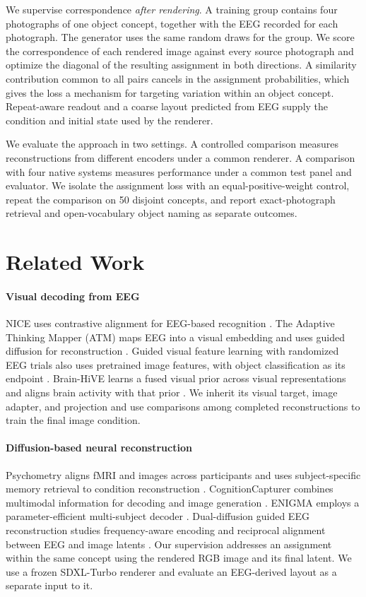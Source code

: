 \documentclass[letterpaper,10pt,conference]{IEEEtran}
\begin{document}
We supervise correspondence \emph{after rendering}. A training group contains four photographs of one object concept, together with the EEG recorded for each photograph. The generator uses the same random draws for the group. We score the correspondence of each rendered image against every source photograph and optimize the diagonal of the resulting assignment in both directions. A similarity contribution common to all pairs cancels in the assignment probabilities, which gives the loss a mechanism for targeting variation within an object concept. Repeat-aware readout and a coarse layout predicted from EEG supply the condition and initial state used by the renderer.

We evaluate the approach in two settings. A controlled comparison measures reconstructions from different encoders under a common renderer. A comparison with four native systems measures performance under a common test panel and evaluator. We isolate the assignment loss with an equal-positive-weight control, repeat the comparison on 50 disjoint concepts, and report exact-photograph retrieval and open-vocabulary object naming as separate outcomes.

\section{Related Work}

\paragraph{Visual decoding from EEG}
NICE uses contrastive alignment for EEG-based recognition \cite{song2024}. The Adaptive Thinking Mapper (ATM) maps EEG into a visual embedding and uses guided diffusion for reconstruction \cite{li2024}. Guided visual feature learning with randomized EEG trials also uses pretrained image features, with object classification as its endpoint \cite{fan2025}. Brain-HiVE learns a fused visual prior across visual representations and aligns brain activity with that prior \cite{zheng2026}. We inherit its visual target, image adapter, and projection and use comparisons among completed reconstructions to train the final image condition.

\paragraph{Diffusion-based neural reconstruction}
Psychometry aligns fMRI and images across participants and uses subject-specific memory retrieval to condition reconstruction \cite{quan2026}. CognitionCapturer combines multimodal information for decoding and image generation \cite{zhang2025}. ENIGMA employs a parameter-efficient multi-subject decoder \cite{kneeland2026}. Dual-diffusion guided EEG reconstruction studies frequency-aware encoding and reciprocal alignment between EEG and image latents \cite{yu2026}. Our supervision addresses an assignment within the same concept using the rendered RGB image and its final latent. We use a frozen SDXL-Turbo renderer \cite{sauer2024} and evaluate an EEG-derived layout as a separate input to it.
\end{document}
